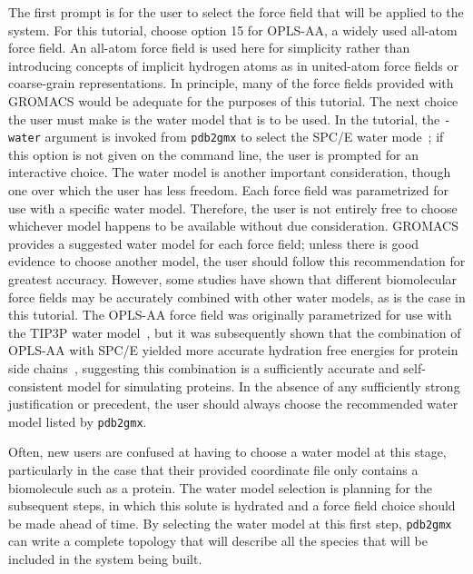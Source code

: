 \documentclass[9pt,tutorial]{livecoms}
\begin{document}
The first prompt is for the user to select the force field that will be applied to the system. For this tutorial, choose option 15 for OPLS-AA, a widely used all-atom force field. An all-atom force field is used here for simplicity rather than introducing concepts of implicit hydrogen atoms as in united-atom force fields or coarse-grain representations. In principle, many of the force fields provided with GROMACS would be adequate for the purposes of this tutorial. The next choice the user must make is the water model that is to be used. In the tutorial, the \texttt{-water} argument is invoked from \texttt{pdb2gmx} to select the SPC/E water mode~\cite{Berendsen1987}; if this option is not given on the command line, the user is prompted for an interactive choice. The water model is another important consideration, though one over which the user has less freedom. Each force field was parametrized for use with a specific water model. Therefore, the user is not entirely free to choose whichever model happens to be available without due consideration. GROMACS provides a suggested water model for each force field; unless there is good evidence to choose another model, the user should follow this recommendation for greatest accuracy. However, some studies have shown that different biomolecular force fields may be accurately combined with other water models, as is the case in this tutorial. The OPLS-AA force field was originally parametrized for use with the TIP3P water model~\cite{Jorgensen1984}, but it was subsequently shown that the combination of OPLS-AA with SPC/E yielded more accurate hydration free energies for protein side chains~\cite{Hess2006}, suggesting this combination is a sufficiently accurate and self-consistent model for simulating proteins. In the absence of any sufficiently strong justification or precedent, the user should always choose the recommended water model listed by \texttt{pdb2gmx}.

Often, new users are confused at having to choose a water model at this stage, particularly in the case that their provided coordinate file only contains a biomolecule such as a protein. The water model selection is planning for the subsequent steps, in which this solute is hydrated and a force field choice should be made ahead of time. By selecting the water model at this first step, \texttt{pdb2gmx} can write a complete topology that will describe all the species that will be included in the system being built.
\end{document}
